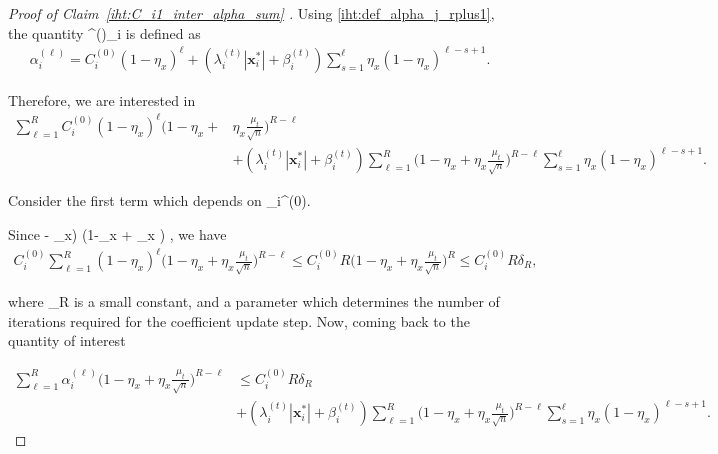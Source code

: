 \documentclass{article}
\def\[#1\]{{$#1$}}
\def\b#1{{\mathbf{#1}}}
\begin{document}
\begin{proof}[Proof of Claim~\ref{iht:C_i1_inter_alpha_sum} ]
	
	
	
	
	
	
	Using \eqref{iht:def_alpha_j_rplus1}, the quantity \[\alpha^{(\ell)}_i\] is defined as
	\begin{align*}
	\alpha^{(\ell)}_i = C_i^{(0)} (1 - \eta_x)^{\ell}  + (\lambda^{(t)}_{i} |\b{x}_i^*| +\beta^{(t)}_i) \textstyle\sum\limits_{s=1}^{\ell}\eta_x (1-\eta_x)^{\ell-s + 1}.
	\end{align*}
	
	Therefore, we are interested in 
	\begin{align*}
	\textstyle\sum\limits_{\ell = 1}^{{R}}  C_i^{(0)} (1 - \eta_x)^{\ell}\big(1-\eta_x + &\eta_x\tfrac{\mu_t}{\sqrt{n}} \big)^{{R} -\ell}  \\&\textstyle+ (\lambda^{(t)}_{i} |\b{x}_i^*| +\beta^{(t)}_i)\sum\limits_{\ell = 1}^{{R}} \big(1-\eta_x + \eta_x\tfrac{\mu_t}{\sqrt{n}} \big)^{{R} -\ell} \sum\limits_{s=1}^{\ell}\eta_x (1-\eta_x)^{\ell-s + 1}.
	\end{align*}
	
	Consider the first term which depends on \[C_i^{(0)}\].
	
	
	
	
	
	Since \[(1 - \eta_x) \leq (1-\eta_x + \eta_x \big)\] 
	, we have 
	\begin{align*}
	C_i^{(0)}\textstyle\sum\limits_{\ell = 1}^{{R}}  (1 - \eta_x)^{\ell}\big(1-\eta_x + \eta_x\tfrac{\mu_t}{\sqrt{n}} \big)^{{R} -\ell}
	\leq C_i^{(0)}{R}\big(1-\eta_x + \eta_x\tfrac{\mu_t}{\sqrt{n}} \big)^{{R}} \leq C_i^{(0)}{R}\delta_{R},
	\end{align*}
	
	where \[\delta_{R}\] is a small constant, and a parameter which determines the number of iterations \[R\] required for the coefficient update step. Now, coming back to the quantity of interest 
	
	
	
	
	
	
	
	
	\begin{align*}
	\textstyle\sum\limits_{\ell = 1}^{{R}}  \alpha^{(\ell)}_{i}\big(1-\eta_x + \eta_x\tfrac{\mu_t}{\sqrt{n}} \big)^{{R} -\ell}
	
	&\leq C_i^{(0)}{R}\delta_{R}  \\&\textstyle+ (\lambda^{(t)}_{i} |\b{x}_i^*| +\beta^{(t)}_i)\sum\limits_{\ell = 1}^{{R}} \big(1-\eta_x + \eta_x\tfrac{\mu_t}{\sqrt{n}} \big)^{{R} -\ell} \sum\limits_{s=1}^{\ell}\eta_x (1-\eta_x)^{\ell-s + 1}.
	\end{align*}
	

\end{proof}
\end{document}
